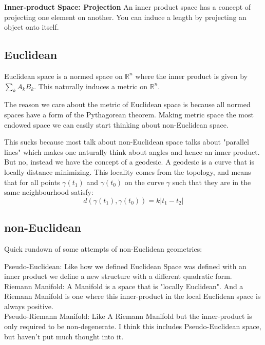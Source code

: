 {\textbf{Inner-product Space: Projection}}
An inner product space has a concept of projecting one element on another.
You can induce a length by projecting an object onto itself.
\begin{center}
\end{center}

\subsection{Euclidean}
Euclidean space is a normed space on $\mathbb{R}^n$ where the inner product is given by $\sum_k A_kB_k$.
This naturally induces a metric on $\mathbb{R}^n$.

The reason we care about the metric of Euclidean space is because all normed spaces have a form of the Pythagorean theorem.
Making metric space the most endowed space we can easily start thinking about non-Euclidean space.

This sucks because most talk about non-Euclidean space talks about "parallel lines" which makes one naturally think about angles and hence an inner product.
But no, instead we have the concept of a geodesic.
A geodesic is a curve that is locally distance minimizing.
This locality comes from the topology, and means that for all points $\gamma(t_1)$ and $\gamma(t_0)$ on the curve $\gamma$ such that they are in the same neighbourhood satisfy:
\[ d(\gamma(t_1),\gamma(t_0)) = k|t_1-t_2|\]

\subsection{non-Euclidean}
Quick rundown of some attempts of non-Euclidean geometries:

Pseudo-Euclidean: Like how we defined Euclidean Space was defined with an inner product we define a new structure with a different quadratic form.
\\

Riemann Manifold: A Manifold is a space that is "locally Euclidean". And a Riemann Manifold is one where this inner-product in the local Euclidean space is always positive.\\

Pseudo-Riemann Manifold: Like A Riemann Manifold but the inner-product is only required to be non-degenerate. I think this includes Pseudo-Euclidean space, but haven't put much thought into it.
